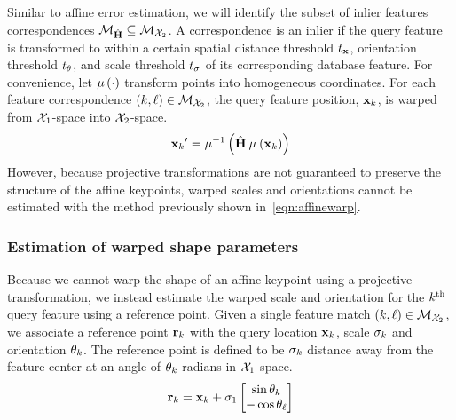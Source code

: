         Similar to affine error estimation, we will identify the subset of inlier features correspondences
        $\mathcal{M}_{\hat{\mathbf{H}}} \subseteq \mathcal{M}_{\mathcal{X}_{2}}$. A correspondence is an inlier if the query feature
        is transformed to within a certain spatial distance threshold $t_{\mathbf{x}}$, orientation threshold
        $t_{{\theta}}$, and scale threshold $t_{{\sigma}}$ of its corresponding database feature. For convenience,
        let $\mathbin{\mu}\left(\cdot\right)$ transform points into homogeneous coordinates. For each feature correspondence $(k,
        \ell) \in \mathcal{M}_{\mathcal{X}_{2}}$, the query feature position, ${\mathbf{x}_{k}}$, is warped from $\mathcal{X}_{1}$-space into
        $\mathcal{X}_{2}$-space.
        \begin{equation}
            {{\ensuremath{\mathbf{x}}_{k}}}' = \mathbin{\mu^{-1}}\left(\hat{\mathbf{H}} \mathbin{\mu}\left({\mathbf{x}_{k}}\right)\right)
        \end{equation}
        However, because projective transformations are not guaranteed
          to preserve the structure of the affine keypoints, warped
          scales and orientations cannot be estimated with the method
          previously shown in~\cref{eqn:affinewarp}.

        \subsubsection{Estimation of warped shape parameters}
        Because we cannot warp the shape of an affine keypoint using a projective transformation, we instead
        estimate the warped scale and orientation for the $k^{\textrm{th}}{}$ query feature using a reference point. Given
        a single feature match $(k, \ell) \in \mathcal{M}_{\mathcal{X}_{2}}$, we associate a reference point ${\mathbf{r}_{k}}$
        with the query location ${\mathbf{x}_{k}}$, scale ${\sigma_{k}}$ and orientation ${\theta_{k}}$. The reference point is defined to
        be ${\sigma_{k}}$ distance away from the feature center at an angle of ${\theta_{k}}$ radians in $\mathcal{X}_{1}$-space.
          \begin{equation}
            {\ensuremath{\mathbf{r}}_{k}} = {\mathbf{x}_{k}} + \sigma_1 \begin{bmatrix} \sin{{\theta_{k}}} \\ -\cos{{\theta_{\ell}}} \end{bmatrix}
          \end{equation}


